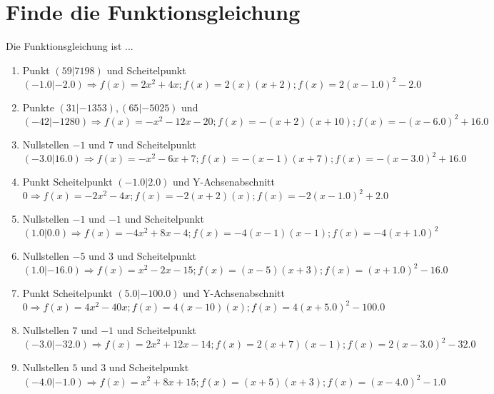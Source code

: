 \documentclass{article}%
\begin{document}
\section{Finde die Funktionsgleichung}%
\label{sec:FindedieFunktionsgleichung}%
Die Funktionsgleichung ist ...%
\begin{enumerate}[label=\alph*)]%
\item%
 Punkt $(59|7198)$ und Scheitelpunkt $(-1.0|-2.0) \Rightarrow f(x)=2x^2 + 4x ; f(x)=2(x)(x+2) ; f(x)=2(x-1.0)^2 -2.0$%
\item%
 Punkte $(31|-1353),(65|-5025)$ und $(-42|-1280) \Rightarrow f(x)=-x^2 - 12x - 20 ; f(x)=-(x+2)(x+10) ; f(x)=-(x-6.0)^2 +16.0$%
\item%
 Nullstellen $-1$ und $7$ und Scheitelpunkt $(-3.0|16.0) \Rightarrow f(x)=-x^2 - 6x + 7 ; f(x)=-(x-1)(x+7) ; f(x)=-(x-3.0)^2 +16.0$%
\item%
 Punkt Scheitelpunkt $(-1.0|2.0)$ und Y-Achsenabschnitt $0 \Rightarrow f(x)=-2x^2 - 4x ; f(x)=-2(x+2)(x) ; f(x)=-2(x-1.0)^2 +2.0$%
\item%
 Nullstellen $-1$ und $-1$ und Scheitelpunkt $(1.0|0.0) \Rightarrow f(x)=-4x^2 + 8x - 4 ; f(x)=-4(x-1)(x-1) ; f(x)=-4(x+1.0)^2$%
\item%
 Nullstellen $-5$ und $3$ und Scheitelpunkt $(1.0|-16.0) \Rightarrow f(x)=x^2 - 2x - 15 ; f(x)=(x-5)(x+3) ; f(x)=(x+1.0)^2 -16.0$%
\item%
 Punkt Scheitelpunkt $(5.0|-100.0)$ und Y-Achsenabschnitt $0 \Rightarrow f(x)=4x^2 - 40x ; f(x)=4(x-10)(x) ; f(x)=4(x+5.0)^2 -100.0$%
\item%
 Nullstellen $7$ und $-1$ und Scheitelpunkt $(-3.0|-32.0) \Rightarrow f(x)=2x^2 + 12x - 14 ; f(x)=2(x+7)(x-1) ; f(x)=2(x-3.0)^2 -32.0$%
\item%
 Nullstellen $5$ und $3$ und Scheitelpunkt $(-4.0|-1.0) \Rightarrow f(x)=x^2 + 8x + 15 ; f(x)=(x+5)(x+3) ; f(x)=(x-4.0)^2 -1.0$%
\end{enumerate}

%
\end{document}
